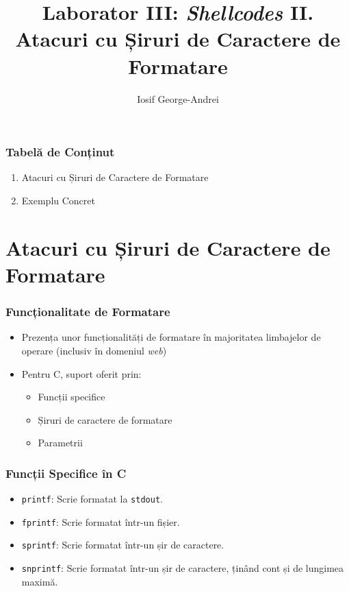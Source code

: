 \documentclass[xcolor={table}]{beamer}
\title{Laborator III: \textit{Shellcodes} II. Atacuri cu Șiruri de Caractere de Formatare}
\subtitle{}
\author{Iosif George-Andrei}
\begin{document}
    \setcounter{showProgressBar}{0}
	\setcounter{showSlideNumbers}{0}
	\frame{\titlepage}

	\begin{frame}
		\frametitle{Tabelă de Conținut}\pause
		\begin{enumerate}[<+->]
			\item Atacuri cu Șiruri de Caractere de Formatare
			\item Exemplu Concret
		\end{enumerate}
	\end{frame}

	\setcounter{framenumber}{0}
	\setcounter{showProgressBar}{1}
	\setcounter{showSlideNumbers}{1}
	\section{Atacuri cu Șiruri de Caractere de Formatare}

	\begin{frame}
		\frametitle{Funcționalitate de Formatare}\pause
		\begin{itemize}[<+->]
		    \item Prezența unor funcționalități de formatare în majoritatea limbajelor de operare (inclusiv în domeniul \textit{web})
			\item Pentru C, suport oferit prin:
			    \begin{itemize}
			        \item Funcții specifice
			        \item Șiruri de caractere de formatare
			        \item Parametrii
			    \end{itemize}
		\end{itemize}
	\end{frame}
	
	\begin{frame}
		\frametitle{Funcții Specifice în C}\pause
		\begin{itemize}[<+->]
			\item \texttt{printf}: Scrie formatat la \texttt{stdout}.
			\item \texttt{fprintf}: Scrie formatat într-un fișier.
			\item \texttt{sprintf}: Scrie formatat într-un șir de caractere.
			\item \texttt{snprintf}: Scrie formatat într-un șir de caractere, ținând cont și de lungimea maximă.
		\end{itemize}
	\end{frame}
	
\end{document}
